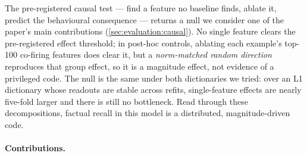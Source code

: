 The pre-registered causal test --- find a feature no baseline finds, ablate
it, predict the behavioural consequence --- returns a null we consider one of
the paper's main contributions (\cref{sec:evaluation:causal}). No single
feature clears the pre-registered effect threshold; in post-hoc controls,
ablating each example's top-100 co-firing features does clear it, but a
\emph{norm-matched random direction} reproduces that group effect, so it is a
magnitude effect, not evidence of a privileged code. The null is the same
under both dictionaries we tried: over an L1 dictionary whose readouts are
stable across refits, single-feature effects are nearly five-fold larger and
there is still no bottleneck. Read through these decompositions, factual
recall in this model is a distributed, magnitude-driven code.

\paragraph{Contributions.}
